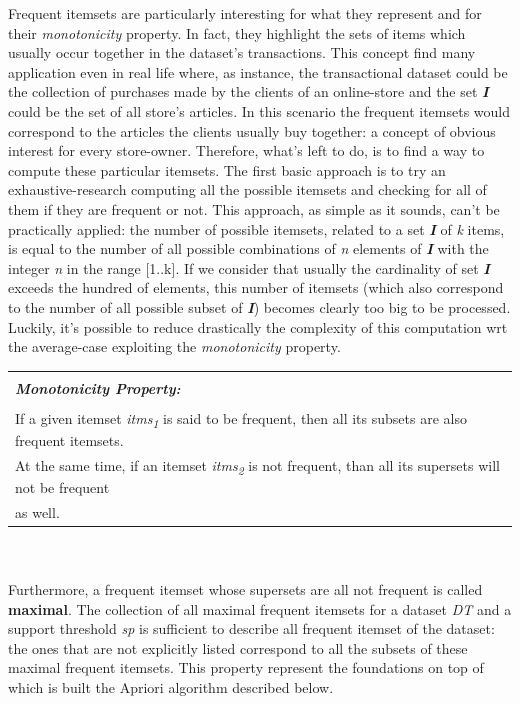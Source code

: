 \documentclass[]{report}
\begin{document}
	Frequent itemsets are particularly interesting for what they represent and for their \textit{monotonicity} property. In fact, they highlight the sets of items which usually occur together in the dataset's transactions. This concept find many application even in real life where, as instance, the transactional dataset could be the collection of purchases made by the clients of an online-store and the set \textbf{\textit{I}} could be the set of all store's articles. In this scenario the frequent itemsets would correspond to the articles the clients usually buy together: a concept of obvious interest for every store-owner. Therefore, what's left to do, is to find a way to compute these particular itemsets. The first basic approach is to try an exhaustive-research computing all the possible itemsets and checking for all of them if they are frequent or not. This approach, as simple as it sounds, can't be practically applied: the number of possible itemsets, related to a set \textbf{\textit{I}} of \textit{k} items, is equal to the number of all possible combinations of \textit{n} elements of \textbf{\textit{I}} with the integer \textit{n} in the range [1..k]. If we consider that usually the cardinality
	of set \textbf{\textit{I}} exceeds the hundred of elements, this number of itemsets (which also correspond to the number of all possible subset of \textbf{\textit{I}}) becomes clearly too big to be processed. Luckily, it's possible to reduce drastically the complexity of this computation wrt the average-case exploiting the \textit{monotonicity} property.
	\\
	\hspace{-5mm}
	\begin{tabular}{ | l | }
		\hline \vspace{-3mm}\\
		\textbf{\textit{Monotonicity Property:}}\\
		\hline \vspace{-3mm}\\
		If a given itemset \textit{itms\textsubscript{1}} is said to be frequent, then all its subsets are also frequent itemsets.\\
		At the same time, if an itemset \textit{itms\textsubscript{2}} is not frequent, than all its supersets will not be frequent \\as well. \\
		\hline	    
	\end{tabular}            
	\\ \vspace{3mm}
	\\
	Furthermore, a frequent itemset whose supersets are all not frequent is called \textbf{maximal}. The collection of all maximal frequent itemsets for a dataset \textit{DT} and a support threshold \textit{sp} is sufficient to describe all frequent itemset of the dataset: the ones that are not explicitly listed correspond to all the subsets of these maximal frequent itemsets. 
	This property represent the foundations on top of which is built the Apriori algorithm described below. 
\end{document}
